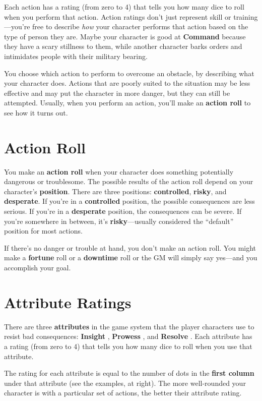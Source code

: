\documentclass[11pt,fleqn,a5paper]{book}
\newcommand{\gameterm}[1]{\textbf{#1}}
\begin{document}
Each action has a rating (from zero to 4) that tells you how many dice to roll when you perform that action. Action ratings don’t just represent skill or training---you’re free to describe \emph{how} your character performs that action based on the type of person they are. Maybe your character is good at \gameterm{Command}  because they have a scary stillness to them, while another character barks orders and intimidates people with their military bearing.

You choose which action to perform to overcome an obstacle, by describing what your character does. Actions that are poorly suited to the situation may be less effective and may put the character in more danger, but they can still be attempted. Usually, when you perform an action, you’ll make an \textbf{action roll} to see how it turns out.

\section{Action Roll}

You make an \textbf{action roll} when your character does something potentially dangerous or troublesome. The possible results of the action roll depend on your character’s \textbf{position}. There are three positions: \textbf{controlled}, \textbf{risky}, and \textbf{desperate}. If you’re in a \textbf{controlled} position, the possible consequences are less serious. If you’re in a \textbf{desperate} position, the consequences can be severe. If you’re somewhere in between, it’s \textbf{risky}---usually considered the “default” position for most actions.

If there’s no danger or trouble at hand, you don’t make an action roll. You might make a \textbf{fortune} roll or a \textbf{downtime} roll or the GM will simply say yes---and you accomplish your goal.

\section{Attribute Ratings}

There are three \textbf{attributes} in the game system that the player characters use to resist bad consequences: \gameterm{Insight} , \gameterm{Prowess} , and \gameterm{Resolve} . Each attribute has a rating (from zero to 4) that tells you how many dice to roll when you use that attribute.

The rating for each attribute is equal to the number of dots in the \textbf{first column} under that attribute (see the examples, at right). The more well-rounded your character is with a particular set of actions, the better their attribute rating.
\end{document}
